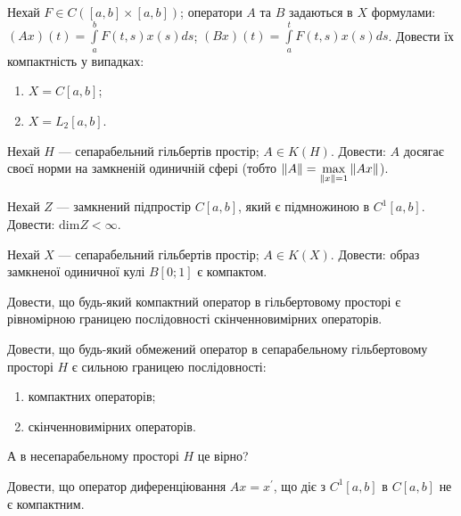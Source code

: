 \begin{exercise}
    Нехай $F \in C([a, b] \times [a, b])$; оператори $A$ та $B$ задаються в $X$ формулами:
    $(Ax)(t)=\int\limits_a^b F(t, s)x(s)ds$; $(Bx)(t) = \int\limits_a^t F(t, s)x(s)ds$.
    Довести їх компактність у випадках:
    \begin{enumerate}
        \item $X = C[a, b]$;
        \item $X = L_2[a, b]$.
    \end{enumerate}
\end{exercise}

\begin{exercise}
    Нехай $H$ --- сепарабельний гільбертів простір; $A \in K(H)$. Довести: $A$ 
    досягає своєї норми на замкненій одиничній сфері (тобто $\left\lVert A\right\rVert = 
    \underset{\left\lVert x\right\rVert = 1}{\max}\left\lVert Ax\right\rVert$).
\end{exercise}

\begin{exercise}
    Нехай $Z$ --- замкнений підпростір $C[a, b]$, який є підмножиною в $C^1[a, b]$. 
    Довести: $\mathrm{dim} Z < \infty$.
\end{exercise}

\begin{exercise}
    Нехай $X$ --- сепарабельний гільбертів простір; $A \in K(X)$. Довести: образ замкненої 
    одиничної кулі $B[0; 1]$ є компактом.
\end{exercise}

\begin{exercise}
    Довести, що будь-який компактний оператор в гільбертовому просторі є рівномірною 
    границею послідовності скінченновимірних операторів.
\end{exercise}

\begin{exercise}
    Довести, що будь-який обмежений оператор в сепарабельному гільбертовому просторі $H$ є 
    сильною границею послідовності:
    \begin{enumerate}
        \item компактних операторів;
        \item скінченновимірних операторів.
    \end{enumerate}
    А в несепарабельному просторі $H$ це вірно?
\end{exercise}

\begin{exercise}
    Довести, що оператор диференціювання $Ax = x^\prime$, що діє з $C^1[a, b]$ в $C[a, b]$ 
    не є компактним.
\end{exercise}
